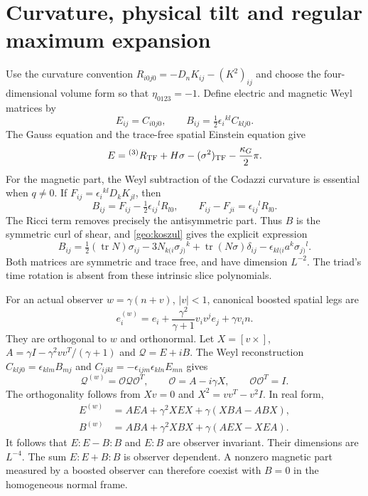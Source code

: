 \section{Curvature, physical tilt and regular maximum expansion}

Use the curvature convention $R_{i0j0}=-D_nK_{ij}-(K^2)_{ij}$ and choose the four-dimensional volume form so that $\eta_{0123}=-1$. Define electric and magnetic Weyl matrices by
\begin{equation}
 E_{ij}=C_{i0j0},\qquad B_{ij}=\tfrac12\epsilon_i{}^{kl}C_{klj0}.
 \label{geo:weyl_definition}
\end{equation}
The Gauss equation and the trace-free spatial Einstein equation give
\begin{equation}
 E={}^{(3)}R_{\rm TF}+H\sigma-(\sigma^2)_{\rm TF}
                                  -\frac{\kappa_G}{2}\pi.
 \label{geo:electric}
\end{equation}
For the magnetic part, the Weyl subtraction of the Codazzi curvature is essential when $q\ne0$. If $F_{ij}=\epsilon_i{}^{kl}D_kK_{jl}$, then
\begin{equation}
 B_{ij}=F_{ij}-\tfrac12\epsilon_{ij}{}^lR_{l0},\qquad
 F_{ij}-F_{ji}=\epsilon_{ij}{}^lR_{l0}.
 \label{geo:magnetic_subtraction}
\end{equation}
The Ricci term removes precisely the antisymmetric part. Thus $B$ is the symmetric curl of shear, and \eqref{geo:koszul} gives the explicit expression
\begin{equation}
 B_{ij}=\tfrac12(\operatorname{tr}N)\sigma_{ij}
 -3N_{k(i}\sigma_{j)}{}^k+\operatorname{tr}(N\sigma)\delta_{ij}
 -\epsilon_{kl(i}a^k\sigma_{j)}{}^l.
 \label{geo:magnetic}
\end{equation}
Both matrices are symmetric and trace free, and have dimension $L^{-2}$. The triad's time rotation is absent from these intrinsic slice polynomials.

For an actual observer $w=\gamma(n+v)$, $|v|<1$, canonical boosted spatial legs are
\begin{equation}
 e_i^{(w)}=e_i+\frac{\gamma^2}{\gamma+1}v_iv^je_j+\gamma v_in.
 \label{geo:observer_legs}
\end{equation}
They are orthogonal to $w$ and orthonormal. Let $X=[v\times]$, $A=\gamma I-\gamma^2vv^T/(\gamma+1)$ and $\mathcal Q=E+iB$. The Weyl reconstruction
$C_{klj0}=\epsilon_{klm}B_{mj}$ and
$C_{ijkl}=-\epsilon_{ijm}\epsilon_{kln}E_{mn}$ gives
\begin{equation}
 \mathcal Q^{(w)}=\mathcal O\mathcal Q\mathcal O^T,
 \qquad \mathcal O=A-i\gamma X,
 \qquad\mathcal O\mathcal O^T=I.
 \label{geo:weyl_boost}
\end{equation}
The orthogonality follows from $Xv=0$ and $X^2=vv^T-v^2I$. In real form,
\begin{align}
 E^{(w)}&=AEA+\gamma^2XEX+\gamma(XBA-ABX),\nonumber\\
 B^{(w)}&=ABA+\gamma^2XBX+\gamma(AEX-XEA).
 \label{geo:weyl_boost_real}
\end{align}
It follows that $E:E-B:B$ and $E:B$ are observer invariant. Their dimensions are $L^{-4}$. The sum $E:E+B:B$ is observer dependent. A nonzero magnetic part measured by a boosted observer can therefore coexist with $B=0$ in the homogeneous normal frame.


